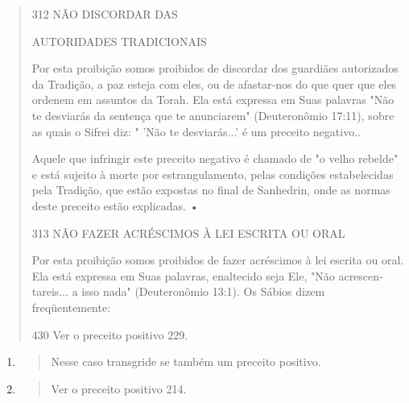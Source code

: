 \begin{quote}
312 NÃO DISCORDAR DAS

AUTORIDADES TRADICIONAIS

Por esta proibição somos proibidos de discordar dos guardiães
au­torizados da Tradição, a paz esteja com eles, ou de afastar-nos do
que quer que eles ordenem em assuntos da Torah. Ela está expressa em
Suas palavras "Não te desviarás da sentença que te anunciarem"
(Deuteronômio 17:11), sobre as quais o Sifrei diz: " 'Não te
desviarás...' é um preceito negativo..

Aquele que infringir este preceito negativo é chamado de "o velho
rebelde" e está sujeito à morte por estrangulamento, pelas condições
estabele­cidas pela Tradição, que estão expostas no final de Sanhedrin,
onde as normas deste preceito estão explicadas. •

313 NÃO FAZER ACRÉSCIMOS À LEI ESCRITA OU ORAL

Por esta proibição somos proibidos de fazer acréscimos à lei escrita ou
oral. Ela está expressa em Suas palavras, enaltecido seja Ele, "Não
acrescen­tareis... a isso nada" (Deuteronômio 13:1). Os Sábios dizem
freqüentemente:

430 Ver o preceito positivo 229.
\end{quote}

\begin{enumerate}
\def\labelenumi{\arabic{enumi}.}
\setcounter{enumi}{430}
\item
 \begin{quote}
 Nesse caso transgride se também um preceito positivo.
 \end{quote}
\item
 \begin{quote}
 Ver o preceito positivo 214.
 \end{quote}
\end{enumerate}

